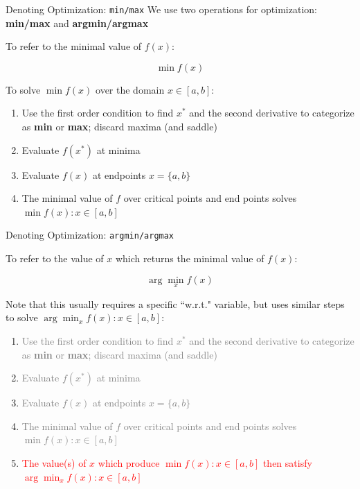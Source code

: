 \documentclass[10pt]{beamer}
\begin{document}
\begin{frame}{Denoting Optimization: \texttt{min/max}}
    We use two operations for optimization: \textbf{min/max} and \textbf{argmin/argmax} \\

    \vspace{.5cm}

    To refer to the minimal value of $f(x)$:

    \[\min f(x)\]

    \vspace{.5cm}

    To solve $\min f(x)$ over the domain $x \in [a,b]$:
    \begin{enumerate}
        \item Use the first order condition to find $x^*$ and the second derivative to categorize as \textbf{min} or \textbf{max}; discard maxima (and saddle) \pause
        \item Evaluate $f(x^*)$ at minima \pause
        \item Evaluate $f(x)$ at endpoints $x = \{a,b\}$ \pause
        \item The minimal value of $f$ over critical points and end points solves $\min f(x) : x \in [a,b]$
    \end{enumerate}
\end{frame}

\begin{frame}{Denoting Optimization: \texttt{argmin/argmax}}

    To refer to the value of $x$ which returns the minimal value of $f(x)$:

    \[\arg\min_x f(x)\]

    Note that this usually requires a specific ``w.r.t." variable, but uses similar steps to solve $\arg\min_x f(x) : x \in [a,b]$:

    \begin{enumerate}
       \item \textcolor{gray}{Use the first order condition to find $x^*$ and the second derivative to categorize as \textbf{min} or \textbf{max}; discard maxima (and saddle)}
        \item \textcolor{gray}{Evaluate $f(x^*)$ at minima}
        \item \textcolor{gray}{Evaluate $f(x)$ at endpoints $x = \{a,b\}$}
        \item \textcolor{gray}{The minimal value of $f$ over critical points and end points solves $\min f(x) : x \in [a,b]$}
        \item \textcolor{red}{The value(s) of $x$ which produce $\min f(x): x \in [a,b]$ then satisfy $\arg\min_x f(x) : x \in [a,b]$}
    \end{enumerate}
    
\end{frame}
\end{document}
